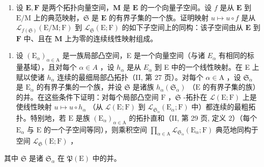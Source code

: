 \begin{enumerate}
\def\labelenumi{\alph{enumi})}
\setcounter{enumi}{1}
\tightlist
\item
  设 \(\mathbf{E},\mathbf{F}\) 是两个拓扑向量空间，\(\mathbf{M}\) 是 \(\mathbf{E}\) 的一个向量子空间。设 \(f\) 是从 \(\mathbf{E}\) 到 \(\mathrm{E / M}\) 上的典范映射，\(\mathfrak{S}\) 是 \(\mathbf{E}\) 的有界子集的一个族。证明映射 \(u\mapsto u\circ f\) 是从 \(\mathcal{L}_{f(\mathfrak{S})}(\mathrm{E / M};\mathrm{F})\) 到 \(\mathcal{L}_{\mathfrak{S}}(\mathrm{E};\mathrm{F})\) 的如下子空间上的同构：该子空间由从 \(\mathbf{E}\) 到 \(\mathbf{F}\) 中、且在 \(\mathbf{M}\) 上为零的连续线性映射组成。
\end{enumerate}

\begin{enumerate}
\def\labelenumi{\arabic{enumi})}
\setcounter{enumi}{4}
\tightlist
\item
  设 \((\mathrm{E}_{\alpha})_{\alpha\in\mathrm{A}}\) 是一族局部凸空间，E 是一个向量空间（与诸 \(E_{\alpha}\) 有相同的标量基域），且对每个 \(\alpha\in A\) ，设 \(h_{\alpha}\) 是从 \(E_{\alpha}\) 到 E 中的一个线性映射。在 E 上赋以使诸 \(h_{\alpha}\) 连续的最细局部凸拓扑（II, 第 27 页）。对每个 \(\alpha \in \mathrm{A}\) ，设 \(\mathfrak{S}_{\alpha}\) 是 \(\mathrm{E}_{\alpha}\) 的有界子集的一个族，并设 \(\mathfrak{S}\) 是诸族 \(h_{\alpha}(\mathfrak{S}_{\alpha})\) （\(\mathrm{E}\) 的有界子集的族）的并。在这些条件下证明：对每个局部凸空间 \(\mathrm{F}\) ，\(\mathfrak{S}\) -拓扑在 \(\mathcal{L}(\mathrm{E};\mathrm{F})\) 上是使线性映射 \(u\mapsto u\circ h_{\alpha}\) （从 \(\mathcal{L}(\mathrm{E};\mathrm{F})\) 到 \(\mathcal{L}_{\mathfrak{S}_{\alpha}}(\mathrm{E}_{\alpha};\mathrm{F})\) 中）都连续的最粗拓扑。特别地，若 \(\mathrm{E}\) 是族 \((\mathrm{E}_{\alpha})_{\alpha \in \mathrm{A}}\) 的拓扑直和（II, 第 29 页, 定义 2）（每个 \(\mathrm{E}_{\alpha}\) 与 \(\mathrm{E}\) 的一个子空间等同），则乘积空间 \(\prod_{\alpha \in \mathrm{A}}\mathcal{L}_{\mathfrak{S}_{\alpha}}(\mathrm{E}_{\alpha};\mathrm{F})\) 典范地同构于空间 \(\mathcal{L}_{\mathfrak{S}}(\mathrm{E};\mathrm{F})\) ，
\end{enumerate}

其中 \(\mathfrak{S}\) 是诸 \(\mathfrak{S}_{\alpha}\) 在 \(\mathfrak{P}(\mathrm{E})\) 中的并。

